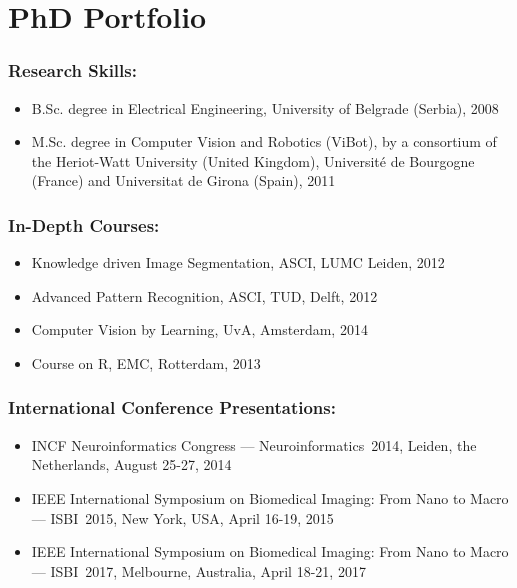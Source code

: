 %
%

\noquote
\orgchpos
\chapter*{PhD Portfolio}

\noindent

\subsection*{Research Skills:}
\vspace{1ex}
\begin{itemize}
	\item B.Sc. degree in Electrical Engineering, University of Belgrade (Serbia), 2008
	
	\item M.Sc. degree in Computer Vision and Robotics (ViBot), by a consortium of the Heriot-Watt University (United Kingdom), Universit\'{e} de Bourgogne (France) and Universitat de Girona (Spain), 2011
\end{itemize}

\subsection*{In-Depth Courses:}
\vspace{1ex}
\begin{itemize}
	\item Knowledge driven Image Segmentation, ASCI, LUMC Leiden, 2012
	
	\item Advanced Pattern Recognition, ASCI, TUD, Delft, 2012
	
	\item Computer Vision by Learning, UvA, Amsterdam, 2014
	
	\item Course on R, EMC, Rotterdam, 2013
\end{itemize}

\subsection*{International Conference Presentations:}
\vspace{1ex}
\begin{itemize}
	\item INCF Neuroinformatics Congress --- Neuroinformatics~2014, Leiden, the Netherlands, August 25-27, 2014

	\item IEEE International Symposium on Biomedical Imaging: From Nano to Macro --- ISBI~2015, New York, USA, April 16-19, 2015

	\item IEEE International Symposium on Biomedical Imaging: From Nano to Macro --- ISBI~2017, Melbourne, Australia, April 18-21, 2017
\end{itemize}

